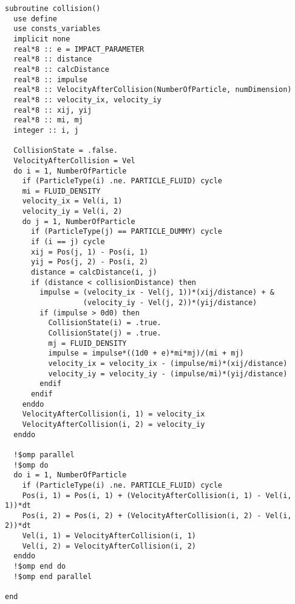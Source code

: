 \begin{lstlisting}[caption=衝突判定ルーチン]
subroutine collision()
  use define
  use consts_variables
  implicit none
  real*8 :: e = IMPACT_PARAMETER
  real*8 :: distance
  real*8 :: calcDistance
  real*8 :: impulse
  real*8 :: VelocityAfterCollision(NumberOfParticle, numDimension)
  real*8 :: velocity_ix, velocity_iy
  real*8 :: xij, yij
  real*8 :: mi, mj
  integer :: i, j

  CollisionState = .false.
  VelocityAfterCollision = Vel
  do i = 1, NumberOfParticle
    if (ParticleType(i) .ne. PARTICLE_FLUID) cycle
    mi = FLUID_DENSITY
    velocity_ix = Vel(i, 1)
    velocity_iy = Vel(i, 2)
    do j = 1, NumberOfParticle
      if (ParticleType(j) == PARTICLE_DUMMY) cycle
      if (i == j) cycle
      xij = Pos(j, 1) - Pos(i, 1)
      yij = Pos(j, 2) - Pos(i, 2)
      distance = calcDistance(i, j)
      if (distance < collisionDistance) then
        impulse = (velocity_ix - Vel(j, 1))*(xij/distance) + &
                  (velocity_iy - Vel(j, 2))*(yij/distance)
        if (impulse > 0d0) then
          CollisionState(i) = .true.
          CollisionState(j) = .true.
          mj = FLUID_DENSITY
          impulse = impulse*((1d0 + e)*mi*mj)/(mi + mj)
          velocity_ix = velocity_ix - (impulse/mi)*(xij/distance)
          velocity_iy = velocity_iy - (impulse/mi)*(yij/distance)
        endif
      endif
    enddo
    VelocityAfterCollision(i, 1) = velocity_ix
    VelocityAfterCollision(i, 2) = velocity_iy
  enddo

  !$omp parallel
  !$omp do
  do i = 1, NumberOfParticle
    if (ParticleType(i) .ne. PARTICLE_FLUID) cycle
    Pos(i, 1) = Pos(i, 1) + (VelocityAfterCollision(i, 1) - Vel(i, 1))*dt
    Pos(i, 2) = Pos(i, 2) + (VelocityAfterCollision(i, 2) - Vel(i, 2))*dt
    Vel(i, 1) = VelocityAfterCollision(i, 1)
    Vel(i, 2) = VelocityAfterCollision(i, 2)
  enddo
  !$omp end do
  !$omp end parallel

end
\end{lstlisting}